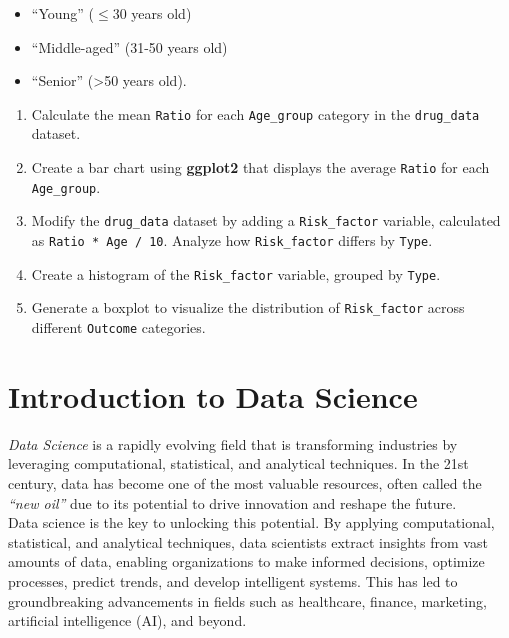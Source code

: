 \documentclass[
  11pt,
]{book}
\providecommand{\tightlist}{%
  \setlength{\itemsep}{0pt}\setlength{\parskip}{0pt}}
\theoremstyle{definition}
\theoremstyle{definition}
\theoremstyle{definition}
\theoremstyle{definition}
\theoremstyle{remark}
\begin{document}
\begin{itemize}
\tightlist
\item
  ``Young'' (\(\leq 30\) years old)
\item
  ``Middle-aged'' (31-50 years old)
\item
  ``Senior'' (\textgreater50 years old).
\end{itemize}

\begin{enumerate}
\def\labelenumi{\arabic{enumi}.}
\setcounter{enumi}{20}
\tightlist
\item
  Calculate the mean \texttt{Ratio} for each \texttt{Age\_group} category in the \texttt{drug\_data} dataset.\\
\item
  Create a bar chart using \textbf{ggplot2} that displays the average \texttt{Ratio} for each \texttt{Age\_group}.\\
\item
  Modify the \texttt{drug\_data} dataset by adding a \texttt{Risk\_factor} variable, calculated as \texttt{Ratio\ *\ Age\ /\ 10}. Analyze how \texttt{Risk\_factor} differs by \texttt{Type}.\\
\item
  Create a histogram of the \texttt{Risk\_factor} variable, grouped by \texttt{Type}.\\
\item
  Generate a boxplot to visualize the distribution of \texttt{Risk\_factor} across different \texttt{Outcome} categories.
\end{enumerate}

\chapter{Introduction to Data Science}\label{chapter-intro-DS}

\emph{Data Science} is a rapidly evolving field that is transforming industries by leveraging computational, statistical, and analytical techniques. In the 21st century, data has become one of the most valuable resources, often called the \emph{``new oil''} due to its potential to drive innovation and reshape the future.\\
Data science is the key to unlocking this potential. By applying computational, statistical, and analytical techniques, data scientists extract insights from vast amounts of data, enabling organizations to make informed decisions, optimize processes, predict trends, and develop intelligent systems. This has led to groundbreaking advancements in fields such as healthcare, finance, marketing, artificial intelligence (AI), and beyond.
\end{document}
